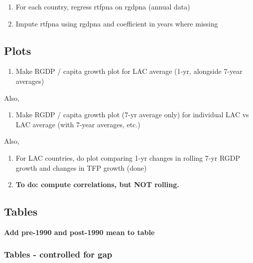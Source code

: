 \documentclass[12pt,english]{article}
\theoremstyle{remark}
\begin{document}
\begin{enumerate}
	\item For each country, regress rtfpna on rgdpna (annual data)
	\item Impute rtfpna using rgdpna and coefficient in years where missing
\end{enumerate}

\subsection{Plots}

\begin{enumerate}
	\item Make RGDP / capita growth plot for LAC average (1-yr, alongside 7-year averages)
\end{enumerate}

Also, 
\begin{enumerate}
	\item Make RGDP / capita growth plot (7-yr average only) for individual LAC vs LAC average (with 7-year averages, etc.)
\end{enumerate}

Also,
\begin{enumerate}
	\item For LAC countries, do plot comparing 1-yr changes in rolling 7-yr RGDP growth and changes in TFP growth (done)
	\item \textbf{To do: compute correlations, but NOT rolling.}
\end{enumerate}

\subsection{Tables}

\textbf{Add pre-1990 and post-1990 mean to table}













\subsubsection{Tables - controlled for gap}
\end{document}
